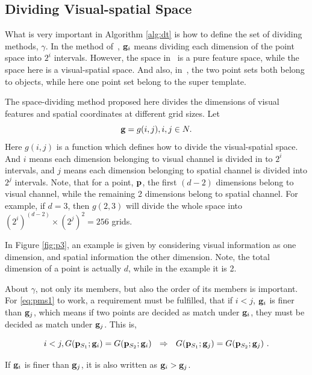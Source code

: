 \subsection{Dividing Visual-spatial Space}

What is very important in Algorithm \ref{alg:dt} is how to define the set of dividing methods, $\gamma$. In the method of~\citep{pmk}, ${\bf g}_i$ means dividing each dimension of the point space into $2^i$ intervals. However, the space in~\citep{pmk} is a pure feature space, while the space here is a visual-spatial space. And also, in~\citep{pmk}, the two point sets both belong to objects, while here one point set belong to the super template.

The space-dividing method proposed here divides the dimensions of visual features and spatial coordinates at different grid sizes. Let
\[{\bf g} = g(i,j),i,j \in N.\]
Here $g(i,j)$ is a function which defines how to divide the visual-spatial space. And $i$ means each dimension belonging to visual channel is divided in to $2^i$ intervals, and $j$ means each dimension belonging to spatial channel is divided into $2^j$ intervals. Note, that for a point, $\bf p$, the first $(d-2)$ dimensions belong to visual channel, while the remaining 2 dimensions belong to spatial channel. For example, if $d=3$, then $g(2,3)$ will divide the whole space into $(2^i)^{(d-2)}\times (2^j)^2=256$ grids.

In Figure \ref{fig:p3}, an example is given by considering visual information as one dimension, and spatial information the other dimension. Note, the total dimension of a point is actually $d$, while in the example it is 2.

About $\gamma$, not only its members, but also the order of its members is important. For \ref{eq:pms1} to work, a requirement must be fulfilled, that if $i<j$, ${\bf g}_i$ is finer than ${\bf g}_j$, which means if two points are decided as match under ${\bf g}_i$, they must be decided as match under ${\bf g}_j$.  This is,



\begin{equation}
i<j, G({\bf p}_{S_1};{\bf g}_i)=G({\bf p}_{S_2};{\bf g}_i)\mbox{     }\mbox{     }\Rightarrow \mbox{     }\mbox{     }G({\bf p}_{S_1};{\bf g}_j)=G({\bf p}_{S_2};{\bf g}_j)\ .
\label{eq:pms3}
\end{equation}

If ${\bf g}_i$ is finer than ${\bf g}_j$, it is also written as ${\bf g}_i>{\bf g}_j$.

